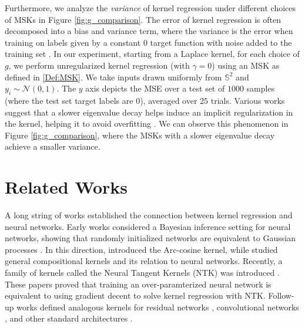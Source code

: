 \documentclass[10pt]{article} %
\theoremstyle{plain}
\theoremstyle{definition}
\theoremstyle{remark}
\begin{document}
Furthermore, we analyze the \emph{variance} of kernel regression under different choices of MSKs in Figure \ref{fig:g_comparison}. The error of kernel regression is often decomposed into a bias and variance term, where the variance is the error when training on labels given by a constant $0$ target function with noise added to the training set \citep{tsigler2023benign}. In our experiment, starting from a Laplace kernel, for each choice of $g$, we perform unregularized kernel regression (with $\gamma=0$) using an MSK as defined in \ref{Def:MSK}. We take inputs drawn uniformly from $\mathbb{S}^2$ and  $y_i\sim \mathcal{N}(0,1)$. The $y$ axis depicts the MSE over a test set of $1000$ samples (where the test set target labels are $0$), averaged over $25$ trials. Various works suggest that a slower eigenvalue decay helps induce an implicit regularization in the kernel, helping it to avoid overfitting \citep{mallinar2022benign, tsigler2023benign}. We can observe this phenomenon in Figure \ref{fig:g_comparison}, where the MSKs with a slower eigenvalue decay achieve a smaller variance.




\section{Related Works}
A long string of works established the connection between kernel regression and neural networks. Early works considered a Bayesian inference setting for neural networks, showing that randomly initialized networks are equivalent to Gaussian processes \citep{williams1997computing,neal2012bayesian}. In this direction, \citet{cho2009kernel} introduced the Arc-cosine kernel, while \citet{daniely2016toward} studied general compositional kernels and its relation to neural networks. Recently, a family of kernels called the Neural Tangent Kernels (NTK) was introduced \citep{jacot2018neural,allen-zhu2019,arora2019exact}. These papers proved that training an over-paramterized neural network is equivalent to using gradient decent to solve kernel regression with NTK. Follow-up works defined analogous kernels for residual networks \citep{huang2020deep}, convolutional networks \citep{arora2019exact,li2019enhanced}, and other standard architectures \citep{yang2020tensor}.
\end{document}
